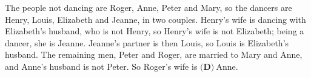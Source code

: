 The people not dancing are Roger, Anne, Peter and Mary, so the dancers are Henry, Louis, Elizabeth and Jeanne, in two couples. Henry's wife is dancing with Elizabeth's husband, who is not Henry, so Henry's wife is not Elizabeth; being a dancer, she is Jeanne. Jeanne's partner is then Louis, so Louis is Elizabeth's husband. The remaining men, Peter and Roger, are married to Mary and Anne, and Anne's husband is not Peter. So Roger's wife is $\boxed{\textbf{(D)}\ \text{Anne}}$.
